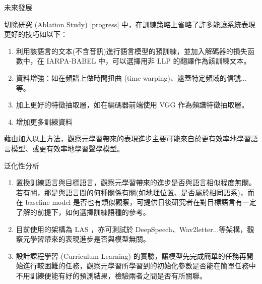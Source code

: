 \documentclass[12pt,UTF8,fntef]{article}
\begin{document}
\begin{section}{未來發展}
  \begin{subsection}{切除研究 (Ablation Study)}
    \ref{progress} 中，在訓練策略上省略了許多能讓系統表現更好的技巧如以下：
    \begin{enumerate}[itemsep=-2mm]
      \item 利用該語言的文本(不含音訊)進行語言模型的預訓練，並加入解碼器的損失函數中，在 IARPA-BABEL 中，可以選擇用非 LLP 的翻譯作為該訓練文本。
      \item 資料增強：如在頻譜上做時間扭曲 (time warping)、遮蓋特定頻域的信號...等。
      \item 加上更好的特徵抽取層，如在編碼器前端使用 VGG 作為頻譜特徵抽取層。
      \item 增加更多訓練資料
    \end{enumerate}
    藉由加入以上方法，觀察元學習帶來的表現進步主要可能來自於更有效率地學習語言模型、或更有效率地學習聲學模型。
  \end{subsection}

  \begin{subsection}{泛化性分析}
    \begin{enumerate}[itemsep=-1mm]
      \item 置換訓練語言與目標語言，觀察元學習帶來的進步是否與語言相似程度無關。若有關，那是與語言間的何種關係有關(如地理位置、是否屬於相同語系)，而在 baseline model 是否也有類似觀察，可提供日後研究者在對目標語言有一定了解的前提下，如何選擇訓練語種的參考。
      \item 目前使用的架構為 LAS \cite{chan2016listen}，亦可測試於 DeepSpeech、Wav2letter...等架構，觀察元學習帶來的表現進步是否與模型無關。
      \item 設計課程學習 (Curriculum Learning) 的實驗，讓模型先完成簡單的任務再開始進行較困難的任務，觀察元學習所學習到的初始化參數是否能在簡單任務中不用訓練便能有好的預測結果，檢驗兩者之間是否有所關聯。
    \end{enumerate}   
  \end{subsection}
\end{section}



\end{document}
